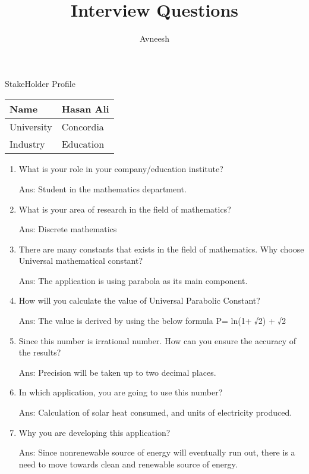 \documentclass[12pt]{article}
\title{Interview Questions}
\author{Avneesh}
\begin{document}
\maketitle

StakeHolder Profile

\vspace{1cm}
\begin{tabular}{|p{3cm}|p{3cm}|}
\hline
Name & Hasan Ali \\
\hline
University & Concordia \\
\hline
Industry & Education \\
\hline
\end{tabular}

\begin{enumerate}

 
\item What is your role in your company/education institute?

Ans:  Student in the mathematics department.

\item What is your area of research in the field of mathematics?

Ans:  Discrete mathematics

\item There are many constants that exists in the field of mathematics. Why choose Universal mathematical constant?

Ans:  The application is using parabola as its main component. 

\item	How will you calculate the value of Universal Parabolic Constant?

Ans:  The value is derived by using the below formula
       P= ln(1+  √2) + √2  

\item Since this number is irrational number. How can you ensure the accuracy of the results?
   
Ans:  Precision will be taken up to two decimal places.

\item	In which application, you are going to use this number?

Ans:  Calculation of solar heat consumed, and units of electricity produced.

\item Why you are developing this application?

Ans:  Since nonrenewable source of energy will eventually run out, there is a need to move           towards clean and renewable source of energy.


\end{enumerate}
\end{document}
